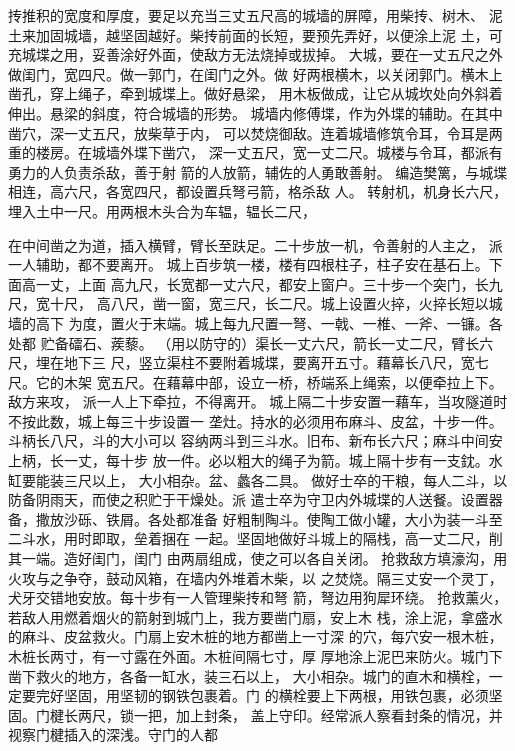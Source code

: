 \documentclass[12pt,UTF8]{ctexbook}
\begin{document}
抟推积的宽度和厚度，要足以充当三丈五尺高的城墙的屏障，用柴抟、树木、 
泥土来加固城墙，越坚固越好。柴抟前面的长短，要预先弄好，以便涂上泥 
土，可充城堞之用，妥善涂好外面，使敌方无法烧掉或拔掉。 
大城，要在一丈五尺之外做闺门，宽四尺。做一郭门，在闺门之外。做 
好两根横木，以关闭郭门。横木上凿孔，穿上绳子，牵到城堞上。做好悬梁， 
用木板做成，让它从城坎处向外斜着伸出。悬梁的斜度，符合城墙的形势。 
城墙内修傅堞，作为外堞的辅助。在其中凿穴，深一丈五尺，放柴草于内， 
可以焚烧御敌。连着城墙修筑令耳，令耳是两重的楼房。在城墙外堞下凿穴， 
深一丈五尺，宽一丈二尺。城楼与令耳，都派有勇力的人负责杀敌，善于射 
箭的人放箭，辅佐的人勇敢善射。 
编造樊篱，与城堞相连，高六尺，各宽四尺，都设置兵弩弓箭，格杀敌 
人。 
转射机，机身长六尺，埋入土中一尺。用两根木头合为车辒，辒长二尺， 

在中间凿之为道，插入横臂，臂长至趺足。二十步放一机，令善射的人主之， 
派一人辅助，都不要离开。 
城上百步筑一楼，楼有四根柱子，柱子安在基石上。下面高一丈，上面 
高九尺，长宽都一丈六尺，都安上窗户。三十步一个突门，长九尺，宽十尺， 
高八尺，凿一窗，宽三尺，长二尺。城上设置火捽，火捽长短以城墙的高下 
为度，置火于末端。城上每九尺置一弩、一戟、一椎、一斧、一镰。各处都 
贮备礌石、蒺藜。 
（用以防守的）渠长一丈六尺，箭长一丈二尺，臂长六尺，埋在地下三 
尺，竖立渠柱不要附着城堞，要离开五寸。藉幕长八尺，宽七尺。它的木架 
宽五尺。在藉幕中部，设立一桥，桥端系上绳索，以便牵拉上下。敌方来攻， 
派一人上下牵拉，不得离开。 
城上隔二十步安置一藉车，当攻隧道时不按此数，城上每三十步设置一 
垄灶。持水的必须用布麻斗、皮盆，十步一件。斗柄长八尺，斗的大小可以 
容纳两斗到三斗水。旧布、新布长六尺；麻斗中间安上柄，长一丈，每十步 
放一件。必以粗大的绳子为箭。城上隔十步有一支鈂。水缸要能装三尺以上， 
大小相杂。盆、蠡各二具。 
做好士卒的干粮，每人二斗，以防备阴雨天，而使之积贮于干燥处。派 
遣士卒为守卫内外城堞的人送餐。设置器备，撒放沙砾、铁屑。各处都准备 
好粗制陶斗。使陶工做小罐，大小为装一斗至二斗水，用时即取，垒着捆在 
一起。坚固地做好斗城上的隔栈，高一丈二尺，削其一端。造好闺门，闺门 
由两扇组成，使之可以各自关闭。 
抢救敌方填濠沟，用火攻与之争夺，鼓动风箱，在墙内外堆着木柴，以 
之焚烧。隔三丈安一个灵丁，犬牙交错地安放。每十步有一人管理柴抟和弩 
箭，弩边用狗犀环绕。 
抢救薰火，若敌人用燃着烟火的箭射到城门上，我方要凿门扇，安上木 
栈，涂上泥，拿盛水的麻斗、皮盆救火。门扇上安木桩的地方都凿上一寸深 
的穴，每穴安一根木桩，木桩长两寸，有一寸露在外面。木桩间隔七寸，厚 
厚地涂上泥巴来防火。城门下凿下救火的地方，各备一缸水，装三石以上， 
大小相杂。城门的直木和横栓，一定要完好坚固，用坚韧的钢铁包裹着。门 
的横栓要上下两根，用铁包裹，必须坚固。门楗长两尺，锁一把，加上封条， 
盖上守印。经常派人察看封条的情况，并视察门楗插入的深浅。守门的人都 
\end{document}
